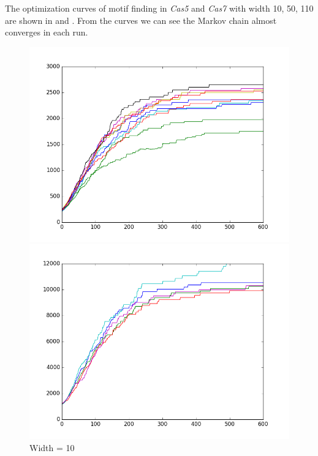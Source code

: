\documentclass[11pt, oneside]{article}
\begin{document}
The optimization curves of motif finding in \textit{Cas5} and \textit{Cas7} with width 10, 50, 110 are shown in  and . From the curves we can see the Markov chain almost converges in each run.
\begin{figure}[htbp]
  \centering
  \begin{minipage}{0.32\textwidth}
    \centering
    \includegraphics[width=1\textwidth]{images/cas5_width10_curve} %
    \caption*{Width = 10}
  \end{minipage}
  \hfill
  \begin{minipage}{0.32\textwidth}
    \centering
    \includegraphics[width=1\textwidth]{images/cas5_width50_curve} %

\end{minipage}
\end{figure}
\end{document}
